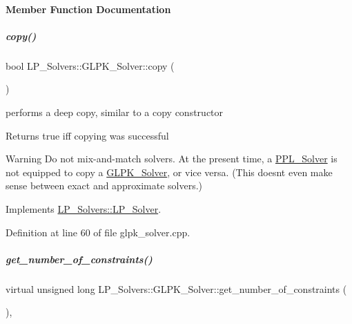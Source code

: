 \paragraph{Member Function Documentation}
\mbox{\label{group___c_l_s_solvers_aafcda320ace4a6892704b46af99ce446}} 
\subparagraph{\texorpdfstring{copy()}{copy()}}
{\footnotesize\ttfamily bool L\+P\+\_\+\+Solvers\+::\+G\+L\+P\+K\+\_\+\+Solver\+::copy (\begin{DoxyParamCaption}\item[{const \hyperlink{group___c_l_s_solvers_class_l_p___solvers_1_1_l_p___solver}{L\+P\+\_\+\+Solver} $\ast$}]{ }\end{DoxyParamCaption})\hspace{0.3cm}{\ttfamily [virtual]}}



performs a deep copy, similar to a copy constructor 

\begin{DoxyReturn}{Returns}
{\ttfamily true} iff copying was successful 
\end{DoxyReturn}
\begin{DoxyWarning}{Warning}
Do not mix-\/and-\/match solvers. At the present time, a \hyperlink{group___c_l_s_solvers_class_l_p___solvers_1_1_p_p_l___solver}{P\+P\+L\+\_\+\+Solver} is not equipped to copy a \hyperlink{group___c_l_s_solvers_class_l_p___solvers_1_1_g_l_p_k___solver}{G\+L\+P\+K\+\_\+\+Solver}, or vice versa. (This doesn\textquotesingle{}t even make sense between exact and approximate solvers.) 
\end{DoxyWarning}


Implements \hyperlink{group___c_l_s_solvers_a36c14a88e9d3ae9d9321acc7877236d0}{L\+P\+\_\+\+Solvers\+::\+L\+P\+\_\+\+Solver}.



Definition at line 60 of file glpk\+\_\+solver.\+cpp.

\mbox{\label{group___c_l_s_solvers_acf743e235ac0476d8d739b139f76a0af}} 
\subparagraph{\texorpdfstring{get\+\_\+number\+\_\+of\+\_\+constraints()}{get\_number\_of\_constraints()}}
{\footnotesize\ttfamily virtual unsigned long L\+P\+\_\+\+Solvers\+::\+G\+L\+P\+K\+\_\+\+Solver\+::get\+\_\+number\+\_\+of\+\_\+constraints (\begin{DoxyParamCaption}{ }\end{DoxyParamCaption})\hspace{0.3cm}{\ttfamily [inline]}, {\ttfamily [virtual]}}




